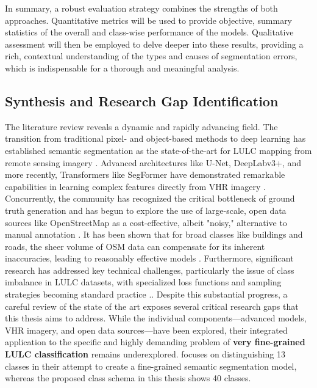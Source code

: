 \documentclass{report}
\begin{document}
In summary, a robust evaluation strategy combines the strengths of both approaches. Quantitative metrics will be used to provide objective, summary statistics of the overall and class-wise performance of the models. Qualitative assessment will then be employed to delve deeper into these results, providing a rich, contextual understanding of the types and causes of segmentation errors, which is indispensable for a thorough and meaningful analysis.
\subsection{Synthesis and Research Gap Identification}
The literature review reveals a dynamic and rapidly advancing field. The transition from traditional pixel- and object-based methods to deep learning has established semantic segmentation as the state-of-the-art for LULC mapping from remote sensing imagery \parencite[p.~311f.]{KotaridisLazaridouRemotesensingimagesegmentationadvancesmetaanalysis2021a}. Advanced architectures like U-Net, DeepLabv3+, and more recently, Transformers like SegFormer have demonstrated remarkable capabilities in learning complex features directly from VHR imagery \parencite[p.~178ff.]{LuoEtAlSemanticsegmentationagriculturalimagessurvey2024}. Concurrently, the community has recognized the critical bottleneck of ground truth generation and has begun to explore the use of large-scale, open data sources like OpenStreetMap as a cost-effective, albeit "noisy," alternative to manual annotation \parencite[p.~1]{KaiserEtAlLearningAerialImageSegmentationOnlineMaps2017}. It has been shown that for broad classes like buildings and roads, the sheer volume of OSM data can compensate for its inherent inaccuracies, leading to reasonably effective models \parencite[p.~2]{KaiserEtAlLearningAerialImageSegmentationOnlineMaps2017}. Furthermore, significant research has addressed key technical challenges, particularly the issue of class imbalance in LULC datasets, with specialized loss functions and sampling strategies becoming standard practice \parencites[p.~7934f.;]{BhatEtAlRobustlossfunctionclassimbalancedsemanticsegmentationimageclassification2023a}[p.~8.]{SertelEtAlLandUseLandCoverMappingUsingDeepLearningBasedSegmentationApproachesVHRWorldview3Images2022}..
Despite this substantial progress, a careful review of the state of the art exposes several critical research gaps that this thesis aims to address. While the individual components—advanced models, VHR imagery, and open data sources—have been explored, their integrated application to the specific and highly demanding problem of \textbf{very fine-grained LULC classification} remains underexplored. \parencite[p.~11f.]{SertelEtAlLandUseLandCoverMappingUsingDeepLearningBasedSegmentationApproachesVHRWorldview3Images2022} focuses on distinguishing 13 classes in their attempt to create a fine-grained semantic segmentation model, whereas the proposed class schema in this thesis shows 40 classes.
\end{document}
